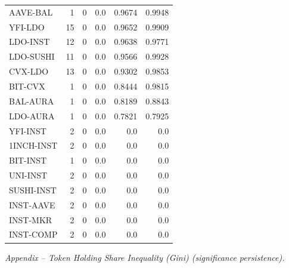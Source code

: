 \begin{table}[!ht]
{\begin{tabular}{lrrrrr}
AAVE-BAL & 1 & 0 & 0.0 & 0.9674 & 0.9948 \\
YFI-LDO & 15 & 0 & 0.0 & 0.9652 & 0.9909 \\
LDO-INST & 12 & 0 & 0.0 & 0.9638 & 0.9771 \\
LDO-SUSHI & 11 & 0 & 0.0 & 0.9566 & 0.9928 \\
CVX-LDO & 13 & 0 & 0.0 & 0.9302 & 0.9853 \\
BIT-CVX & 1 & 0 & 0.0 & 0.8444 & 0.9815 \\
BAL-AURA & 1 & 0 & 0.0 & 0.8189 & 0.8843 \\
LDO-AURA & 1 & 0 & 0.0 & 0.7821 & 0.7925 \\
YFI-INST & 2 & 0 & 0.0 & 0.0 & 0.0 \\
1INCH-INST & 2 & 0 & 0.0 & 0.0 & 0.0 \\
BIT-INST & 1 & 0 & 0.0 & 0.0 & 0.0 \\
UNI-INST & 2 & 0 & 0.0 & 0.0 & 0.0 \\
SUSHI-INST & 2 & 0 & 0.0 & 0.0 & 0.0 \\
INST-AAVE & 2 & 0 & 0.0 & 0.0 & 0.0 \\
INST-MKR & 2 & 0 & 0.0 & 0.0 & 0.0 \\
INST-COMP & 2 & 0 & 0.0 & 0.0 & 0.0 \\
\hline
\end{tabular}
}
\vspace{2mm}\textit{Appendix – Token Holding Share Inequality (Gini) (significance persistence).}
\end{table}
